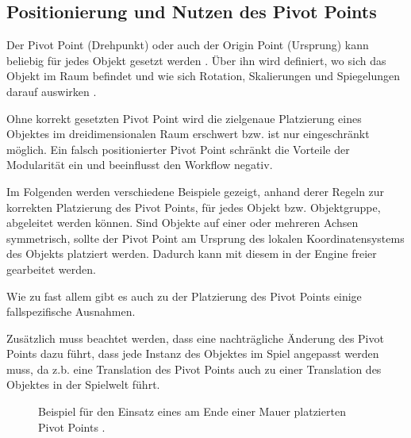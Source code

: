 \subsection{Positionierung und Nutzen des Pivot Points}
Der Pivot Point (Drehpunkt) oder auch der Origin Point (Ursprung) kann beliebig für jedes Objekt gesetzt werden \parencite[S.\,85]{blender}. Über ihn wird definiert, wo sich das Objekt im Raum befindet und wie sich Rotation, Skalierungen und Spiegelungen darauf auswirken \parencite[S.\,85 \& S.102]{blender}.
\par
Ohne korrekt gesetzten Pivot Point wird die zielgenaue Platzierung eines Objektes im dreidimensionalen Raum erschwert bzw. ist nur eingeschränkt möglich. Ein falsch positionierter Pivot Point schränkt die Vorteile der Modularität ein und beeinflusst den Workflow negativ. \parencite{Mader}
\par
Im Folgenden werden verschiedene Beispiele gezeigt, anhand derer Regeln zur korrekten Platzierung des Pivot Points, für jedes Objekt bzw. Objektgruppe, abgeleitet werden können. Sind Objekte auf einer oder mehreren Achsen symmetrisch, sollte der Pivot Point am Ursprung des lokalen Koordinatensystems des Objekts platziert werden. Dadurch kann mit diesem in der Engine freier gearbeitet werden. \parencite{Mader}
\par
Wie zu fast allem gibt es auch zu der Platzierung des Pivot Points einige fallspezifische Ausnahmen. 
\par
Zusätzlich muss beachtet werden, dass eine nachträgliche Änderung des Pivot Points dazu führt, dass jede Instanz des Objektes im Spiel angepasst werden muss, da z.b. eine Translation des Pivot Points auch zu einer Translation des Objektes in der Spielwelt führt. \parencite{Burgess}
\begin{figure}[H]
\centering
  \caption{Beispiel für den Einsatz eines am Ende einer Mauer platzierten Pivot Points \parencite{unrealModular}.}
	\label{cornerPiece}
\end{figure}
